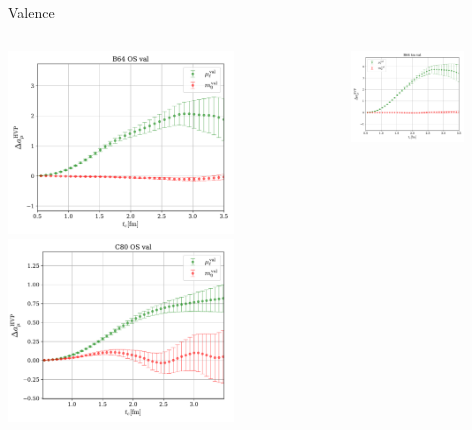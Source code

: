 \documentclass[xcolor={dvipsnames,table}]{beamer}
\begin{document}
\begin{frame}{Valence}
  \begin{columns}
    \begin{column}{0.5\textwidth}
      \includegraphics[trim=0cm 0.0cm 0cm 0cm, clip,width=0.7\textwidth]{plots-francesca/B64_OS_val.pdf}
      \includegraphics[trim=0cm 0.0cm 0cm 0cm, clip,width=0.7\textwidth]{plots-francesca/C80_OS_val.pdf}
    \end{column}
    \begin{column}{0.5\textwidth}
      \includegraphics[trim=0cm 0.0cm 0cm 0cm, clip,width=0.7\textwidth]{plots-francesca/B64_TM_val.pdf}

\end{column}
\end{columns}
\end{frame}
\end{document}
